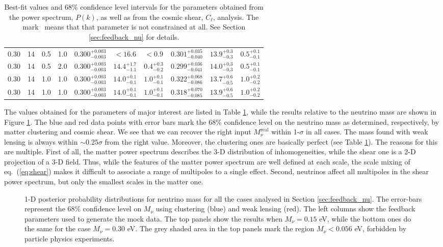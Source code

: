 \documentclass[a4paper,11pt]{article}
\newcommand{\xmark}{\ding{55}}
\newcommand{\eq}[1]{eq.~(\ref{#1})}
\begin{document}
\begin{table}[!t]
{\begin{tabular}{cccc|ccc|ccc}
0.30 &  14 &  0.5 & 1.0 &
  $\mathbf{0.300^{+0.003}_{-0.003}}$ & $<16.6$ & $<0.9$ &
  $\mathbf{0.301^{+0.035}_{-0.040}}$ & $13.9^{+0.3}_{-0.3}$ & $0.5^{+0.1}_{-0.1}$ \tabularnewline
0.30 &  14 &  0.5 & 2.0 &
  $\mathbf{0.300^{+0.003}_{-0.003}}$ & $14.4^{+1.7}_{-1.1}$ & $0.4^{+0.3}_{-0.2}$ &
  $\mathbf{0.299^{+0.036}_{-0.041}}$ & $14.0^{+0.3}_{-0.3}$ & $0.5^{+0.1}_{-0.1}$ \tabularnewline
0.30 &  14 &  1.0 & 1.0 &
  $\mathbf{0.300^{+0.003}_{-0.003}}$ & $14.0^{+0.1}_{-0.1}$ & $1.0^{+0.1}_{-0.1}$ &
  $\mathbf{0.322^{+0.068}_{-0.086}}$ & $13.7^{+0.6}_{-0.5}$ & $1.0^{+0.2}_{-0.2}$ \tabularnewline
0.30 &  14 &  1.0 & 1.0 &
  $\mathbf{0.300^{+0.003}_{-0.003}}$ & $14.0^{+0.1}_{-0.1}$ & $1.0^{+0.1}_{-0.1}$ &
  $\mathbf{0.318^{+0.070}_{-0.085}}$ & $13.9^{+0.6}_{-0.5}$ & $1.0^{+0.2}_{-0.2}$ \tabularnewline
  \bottomrule
  \end{tabular}
 }
\caption{Best-fit values and 68\% confidence level intervals for the parameters obtained from the power spectrum, $P(k)$, as well as from the cosmic shear, $C_\ell$, analysis. The mark \xmark \ means that that parameter is not constrained at all. See Section \ref{sec:feedback_nu} for details.}
\label{table:Pk_Cl}
 \end{table}

The values obtained for the parameters of major interest are listed in Table \ref{table:Pk_Cl}, while the results relative to the neutrino mass are shown in Figure \ref{fig:results_Pk_Cl}.
The blue and red data points with error bars mark the 68\% confidence level on the neutrino mass as determined, respectively, by matter clustering and cosmic shear.
We see that we can recover the right input $M^\mathrm{real}_\nu$ within 1-$\sigma$ in all cases.
The mass found with weak lensing is always within $\sim0.25\sigma$ from the right value. Moreover, the clustering ones are basically perfect (see Table \ref{table:Pk_Cl}).
The reasons for this are multiple. First of all, the matter power spectrum describes the 3-D distribution of inhomogeneities, while the shear one is a 2-D projection of a 3-D field. Thus, while the features of the matter power spectrum are well defined at each scale, the scale mixing of \eq{eq:shear} makes it difficult to associate a range of multipoles to a single effect. Second, neutrinos affect all multipoles in the shear power spectrum, but only the smallest scales in the matter one.

\begin{figure}[t]
\caption{1-D posterior probability distributions for neutrino mass for all the cases analysed in Section \ref{sec:feedback_nu}. The error-bars represent the 68\% confidence level on $M_\nu$ using clustering (blue) and weak lensing (red). The left columns show the feedback parameters used to generate the mock data. The top panels show the results when $M_\nu = 0.15$ eV, while the bottom ones do the same for the case $M_\nu = 0.30$ eV. The grey shaded area in the top panels mark the region $M_\nu < 0.056$ eV, forbidden by particle physics experiments.}
\label{fig:results_Pk_Cl}
\end{figure}
\end{document}
